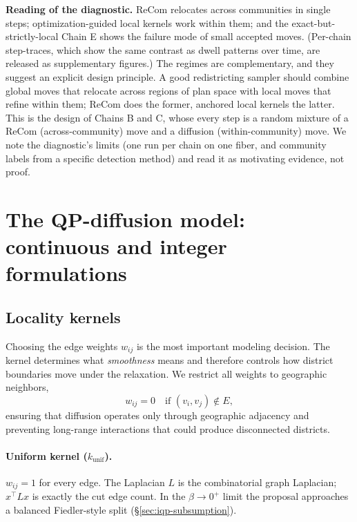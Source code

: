\documentclass[11pt]{article}
\begin{document}
\textbf{Reading of the diagnostic.} ReCom relocates across
communities in single steps; optimization-guided local kernels work
within them; and the exact-but-strictly-local Chain E shows the
failure mode of small accepted moves. (Per-chain step-traces, which
show the same contrast as dwell patterns over time, are released as
supplementary figures.) The regimes are complementary, and they
suggest an explicit design principle. A good redistricting sampler
should combine global moves that relocate across regions of plan
space with local moves that refine within them; ReCom does the
former, anchored local kernels the latter. This is the design of
Chains B and C, whose every step is a random mixture of a ReCom
(across-community) move and a diffusion (within-community) move. We
note the diagnostic's limits (one run per chain on one fiber, and
community labels from a specific detection method) and read it as
motivating evidence, not proof.

\section{The QP-diffusion model: continuous and integer formulations}\label{sec:model}

\subsection{Locality kernels}\label{sec:kernels}

Choosing the edge weights $w_{ij}$ is the most important modeling
decision. The kernel determines what \emph{smoothness} means and
therefore controls how district boundaries move under the relaxation.
We restrict all weights to geographic neighbors,
\begin{equation}\label{eq:kernel-local}
  w_{ij} = 0 \quad \text{if } (v_i, v_j) \notin E,
\end{equation}
ensuring that diffusion operates only through geographic adjacency and
preventing long-range interactions that could produce disconnected
districts.

\paragraph{Uniform kernel ($k_{\mathrm{unif}}$).} $w_{ij} = 1$ for
every edge. The Laplacian $L$ is the combinatorial graph Laplacian;
$x^\top L x$ is exactly the cut edge count. In the $\beta \to 0^+$
limit the proposal approaches a balanced Fiedler-style split
(\S\ref{sec:iqp-subsumption}).
\end{document}
